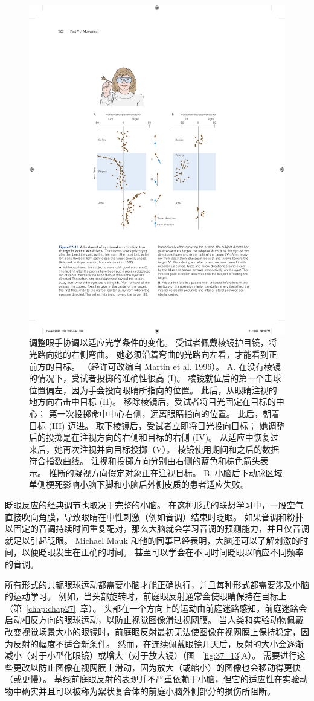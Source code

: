 \begin{figure}[htbp]
	\centering
	\includegraphics[width=0.65\linewidth]{chap37/fig_37_12}
	\caption{调整眼手协调以适应光学条件的变化。 受试者佩戴棱镜护目镜，将光路向她的右侧弯曲。 她必须沿着弯曲的光路向左看，才能看到正前方的目标。 （经许可改编自 Martin et al. 1996）。 A. 在没有棱镜的情况下，受试者投掷的准确性很高 (I)。 棱镜就位后的第一个击球位置偏左，因为手会投向眼睛所指向的位置。 此后，从眼睛注视的地方向右击中目标 (II)。 移除棱镜后，受试者将目光固定在目标的中心； 第一次投掷命中中心右侧，远离眼睛指向的位置。 此后，朝着目标 (III) 迈进。 取下棱镜后，受试者立即将目光投向目标； 她调整后的投掷是在注视方向的右侧和目标的右侧 (IV)。 从适应中恢复过来后，她再次注视并向目标投掷（V）。 棱镜使用期间和之后的数据符合指数曲线。 注视和投掷方向分别由右侧的蓝色和棕色箭头表示。 推断的凝视方向假定对象正在注视目标。 B. 小脑后下动脉区域单侧梗死影响小脑下脚和小脑后外侧皮质的患者适应失败。}
	\label{fig:37_12}
\end{figure}


眨眼反应的经典调节也取决于完整的小脑。
在这种形式的联想学习中，一股空气直接吹向角膜，导致眼睛在中性刺激（例如音调）结束时眨眼。
如果音调和粉扑以固定的音调持续时间重复配对，那么大脑就会学习音调的预测能力，并且仅音调就足以引起眨眼。
Michael Mauk 和他的同事已经表明，大脑还可以了解刺激的时间，以便眨眼发生在正确的时间。
甚至可以学会在不同时间眨眼以响应不同频率的音调。


所有形式的共轭眼球运动都需要小脑才能正确执行，并且每种形式都需要涉及小脑的运动学习。
例如，当头部旋转时，前庭眼反射通常会使眼睛保持在目标上（第~\ref{chap:chap27}~章）。
头部在一个方向上的运动由前庭迷路感知，前庭迷路会启动相反方向的眼球运动，以防止视觉图像滑过视网膜。
当人类和实验动物佩戴改变视觉场景大小的眼镜时，前庭眼反射最初无法使图像在视网膜上保持稳定，因为反射的幅度不适合新条件。
然而，在连续佩戴眼镜几天后，反射的大小会逐渐减小（对于小型化眼镜）或增大（对于放大镜）（图 ~\ref{fig:37_13}A）。
需要进行这些更改以防止图像在视网膜上滑动，因为放大（或缩小）的图像也会移动得更快（或更慢）。
基线前庭眼反射的表现并不严重依赖于小脑，但它的适应性在实验动物中确实并且可以被称为絮状复合体的前庭小脑外侧部分的损伤所阻断。


